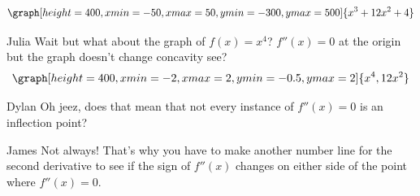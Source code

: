 \documentclass{ximera}
\begin{document}
\begin{question}
\begin{multipleChoice}
\end{multipleChoice}
\begin{feedback}
\[
\graph[height=400,xmin=-50,xmax=50,ymin=-300,ymax=500]{x^3+12x^2+4}
\]
\end{feedback}
\end{question}
\begin{dialogue}
\item[Julia] Wait but what about the graph of $f(x)=x^4$? $f''(x)=0$ at the origin but the graph doesn't change concavity see?
\[
\graph[height=400,xmin=-2,xmax=2,ymin=-0.5,ymax=2]{x^4,12x^2}
\]
\item[Dylan] Oh jeez, does that mean that not every instance of $f''(x)=0$ is an inflection point?
\item[James] Not always! That's why you have to make another number line for the second derivative to see if the sign of $f''(x)$ changes on either side of the point where $f''(x)=0$.
\end{dialogue}
\end{document}
